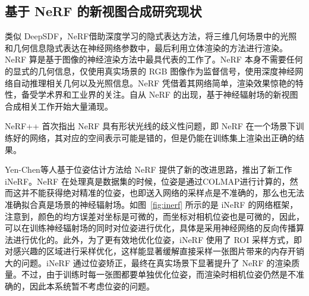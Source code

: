 
\subsection{基于 NeRF 的新视图合成研究现状}
类似 DeepSDF\cite{park2019deepsdf}，NeRF\cite{mildenhall2020nerf}借助深度学习的隐式表达方法，将三维几何场景中的光照和几何信息隐式表达在神经网络参数中，最后利用立体渲染的方法进行渲染。NeRF 算是基于图像的神经渲染方法中最具代表的工作了。NeRF 本身不需要任何的显式的几何信息，仅使用真实场景的 RGB 图像作为监督信号，使用深度神经网络自动推理相关几何以及光照信息。NeRF 凭借着其网络简单，渲染效果惊艳的特性，备受学术界和工业界的关注。自从 NeRF 的出现，基于神经辐射场的新视图合成相关工作开始大量涌现。

NeRF++\cite{zhang2020nerf++} 首次指出 NeRF 具有形状光线的歧义性问题，即 NeRF 在一个场景下训练好的网络，其对应的空间表示可能是错的，但是仍能在训练集上渲染出正确的结果。

%

Yen-Chen等人\cite{yen2020inerf}基于位姿估计方法给 NeRF 提供了新的改进思路，推出了新工作 iNeRF。NeRF 在处理真是数据集的时候，位姿是通过COLMAP\cite{schonberger2016structure}进行计算的，然而这并不能获得绝对精准的位姿，也即送入网络的采样点是不准确的，那么也无法准确拟合真是场景的神经辐射场。如图~\ref{fig:inerf} 所示的是 iNeRF 的网络框架，注意到，颜色的均方误差对坐标是可微的，而坐标对相机位姿也是可微的，因此，可以在训练神经辐射场的同时对位姿进行优化，具体是采用神经网络的反向传播算法进行优化的。此外，为了更有效地优化位姿，iNeRF 使用了 ROI 采样方式，即对感兴趣的区域进行采样优化，这样能显著缓解直接采样一张图片带来的内存开销大的问题。iNeRF 通过位姿矫正，最终在真实场景下显著提升了 NeRF 的渲染质量。不过，由于训练时每一张图都要单独优化位姿，而渲染时相机位姿仍然是不准确的，因此本系统暂不考虑位姿的问题。

